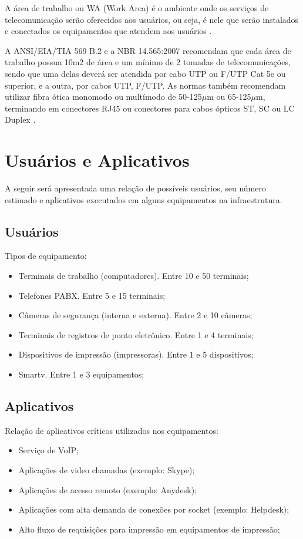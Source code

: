 \documentclass[	DIV=calc,%
							paper=a4,%
							fontsize=12pt,%
							onecolumn]{scrartcl}	 					%
\begin{document}
A área de trabalho ou WA (Work Area) é o ambiente onde os serviços de telecomunicação serão oferecidos aos usuários, ou seja, é nele que serão instalados e
conectados os equipamentos que atendem aos usuários \cite{senai2012}.

A ANSI/EIA/TIA 569 B.2 e a NBR 14.565:2007 recomendam que cada área de
trabalho possua 10m2 de área e um mínimo de 2 tomadas de telecomunicações,
sendo que uma delas deverá ser atendida por cabo UTP ou F/UTP Cat 5e ou superior, e a outra, por cabos UTP, F/UTP. As normas também recomendam utilizar
fibra ótica monomodo ou multímodo de 50-125$\mu$m ou 65-125$\mu$m, terminando em conectores RJ45 ou conectores para cabos ópticos ST, SC ou LC Duplex \cite{senai2012}.


\section{Usuários e Aplicativos}
A seguir será apresentada uma relação de possíveis usuários, seu número estimado e aplicativos executados em alguns equipamentos na infraestrutura. 
 

\subsection{Usuários}
Tipos de equipamento:
\begin{itemize}
	\item Terminais de trabalho (computadores). Entre 10 e 50 terminais;
	\item Telefones PABX. Entre 5 e 15 terminais;
	\item Câmeras de segurança (interna e externa). Entre 2 e 10 câmeras;
	\item Terminais de registros de ponto eletrônico. Entre 1 e 4 terminais;
	\item Dispositivos de impressão (impressoras). Entre 1 e 5 dispositivos;
	\item Smartv. Entre 1 e 3 equipamentos;
\end{itemize}


\subsection{Aplicativos}

Relação de aplicativos críticos utilizados nos equipamentos:

\begin{itemize}
	\item Serviço de VoIP;
	\item Aplicações de video chamadas (exemplo: Skype);
	\item Aplicações de acesso remoto (exemplo: Anydesk);
	\item Aplicações com alta demanda de conexões por socket (exemplo: Helpdesk);
	\item Alto fluxo de requisições para impressão em equipamentos de impressão;
\end{itemize}
\end{document}
